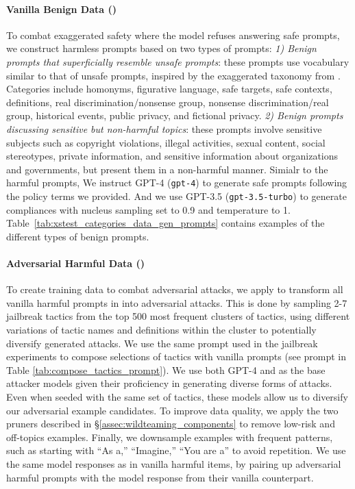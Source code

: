 \paragraph{Vanilla Benign Data (\vanib)}
To combat exaggerated safety where the model refuses answering safe prompts, we construct harmless prompts based on two types of prompts:  \textit{1) Benign prompts that superficially resemble unsafe prompts}: these prompts use vocabulary similar to that of unsafe prompts, inspired by the exaggerated taxonomy from \citep{xstest}. Categories include homonyms, figurative language, safe targets, safe contexts, definitions, real discrimination/nonsense group, nonsense discrimination/real group, historical events, public privacy, and fictional privacy. \textit{2) Benign prompts discussing sensitive but non-harmful topics}:
these prompts involve sensitive subjects such as copyright violations, illegal activities, sexual content, social stereotypes, private information, and sensitive information about organizations and governments, but present them in a non-harmful manner.  Simialr to the harmful prompts, We instruct GPT-4  (\texttt{gpt-4}) to generate safe prompts following the policy terms we provided. And we use GPT-3.5 (\texttt{gpt-3.5-turbo}) to generate compliances with nucleus sampling set to 0.9 and temperature to 1. 
Table~\ref{tab:xstest_categories_data_gen_prompts} contains examples of the different types of benign prompts. 

\paragraph{Adversarial Harmful Data (\advh)}

To create training data to combat adversarial attacks, we apply \method to transform all vanilla harmful prompts in \dataset into adversarial attacks. This is done by sampling 2-7 jailbreak tactics from the top 500 most frequent clusters of \itwshort tactics, using different variations of tactic names and definitions within the cluster to potentially diversify generated attacks. We use the same prompt used in the jailbreak experiments to compose selections of tactics with vanilla prompts (see prompt in Table \ref{tab:compose_tactics_prompt}). We use both GPT-4 and \mixtral as the base attacker models given their proficiency in generating diverse forms of attacks. Even when seeded with the same set of tactics, these models allow us to diversify our adversarial example candidates. To improve data quality, we apply the two pruners described in \S\ref{assec:wildteaming_components} to remove low-risk and off-topics examples. Finally, we downsample examples with frequent patterns, such as starting with ``As a,'' ``Imagine,'' ``You are a'' to avoid repetition. We use the same model responses as in vanilla harmful items, by pairing up adversarial harmful prompts with the model response from their vanilla counterpart.

